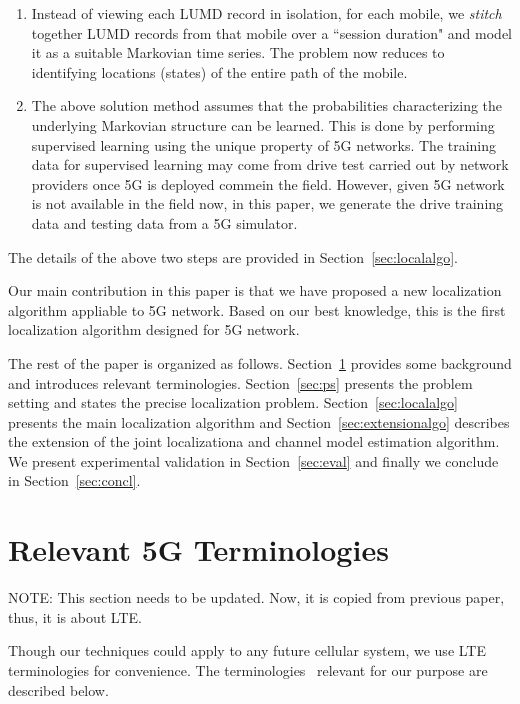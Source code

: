\documentclass[conference, 10pt]{IEEEtran}
\begin{document}
\begin{enumerate}
\item Instead of viewing each LUMD record in isolation, for each mobile, we {\em stitch}
together LUMD records from that mobile over a ``session
duration"  and model it as a suitable Markovian time series. The problem now
reduces to identifying locations (states) of the entire path of
the mobile.

\item The above solution method assumes that the probabilities characterizing the
underlying Markovian structure can be learned. This is done by performing supervised learning using the unique property of 5G networks.
The training data for supervised learning may come from
drive test carried out by network providers once 5G is deployed commein the field. However, given 5G network is not available in the field now, 
in this paper, we generate the drive training data and testing data from a 5G simulator.
	
\end{enumerate}

The details of the above two steps are provided in Section~\ref{sec:localalgo}.


Our main contribution in this paper is that we have proposed a new localization algorithm
appliable to 5G network. Based on our best knowledge, this is the first localization algorithm designed for 5G network. 


The rest of the paper is organized as follows. Section~\ref{sec:bg} provides some
background and introduces relevant terminologies. Section~\ref{sec:ps} presents
the problem setting and states the precise localization problem.
Section~\ref{sec:localalgo}
presents the main localization algorithm and Section~\ref{sec:extensionalgo} describes the extension of the joint localizationa and channel model estimation algorithm. 
We present experimental validation in Section~\ref{sec:eval} and finally we conclude in
Section~\ref{sec:concl}.




\section{Relevant 5G Terminologies}
\label{sec:bg}
NOTE: This section needs to be updated. Now, it is copied from previous paper, thus, it is about LTE.

Though our techniques could apply to any future cellular system, we use LTE
terminologies for convenience. The terminologies~\cite{ltebook} relevant for our purpose are
described below.
\end{document}
